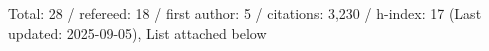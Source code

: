 Total: 28 / refereed: 18 / first author: 5 / citations: 3,230 / h-index: 17 (Last updated: 2025-09-05), List attached below